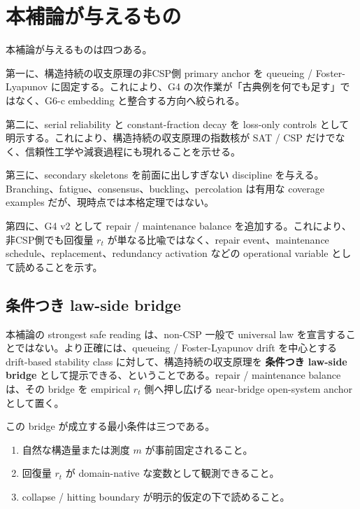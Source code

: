 \documentclass[12pt,a4paper]{article}
\begin{document}
\section{本補論が与えるもの}\label{ux672cux88dcux8ad6ux304cux4e0eux3048ux308bux3082ux306e}

本補論が与えるものは四つある。

第一に、構造持続の収支原理の非CSP側 primary anchor を queueing / Foster-Lyapunov に固定する。これにより、G4 の次作業が「古典例を何でも足す」ではなく、G6-c embedding と整合する方向へ絞られる。

第二に、serial reliability と constant-fraction decay を loss-only controls として明示する。これにより、構造持続の収支原理の指数核が SAT / CSP だけでなく、信頼性工学や減衰過程にも現れることを示せる。

第三に、secondary skeletons を前面に出しすぎない discipline を与える。Branching、fatigue、consensus、buckling、percolation は有用な coverage examples だが、現時点では本格定理ではない。

第四に、G4 v2 として repair / maintenance balance を追加する。これにより、非CSP側でも回復量 \(r_{t}\) が単なる比喩ではなく、repair event、maintenance schedule、replacement、redundancy activation などの operational variable として読めることを示す。

\subsection{条件つき law-side bridge}\label{ux6761ux4ef6ux3064ux304d-law-side-bridge}

本補論の strongest safe reading は、non-CSP 一般で universal law を宣言することではない。より正確には、queueing / Foster-Lyapunov drift を中心とする drift-based stability class に対して、構造持続の収支原理を \textbf{条件つき law-side bridge} として提示できる、ということである。repair / maintenance balance は、その bridge を empirical \(r_{t}\) 側へ押し広げる near-bridge open-system anchor として置く。

この bridge が成立する最小条件は三つである。

\begin{enumerate}
\def\labelenumi{\arabic{enumi}.}
\tightlist
\item
  自然な構造量または測度 \(m\) が事前固定されること。
\item
  回復量 \(r_{t}\) が domain-native な変数として観測できること。
\item
  collapse / hitting boundary が明示的仮定の下で読めること。
\end{enumerate}
\end{document}
